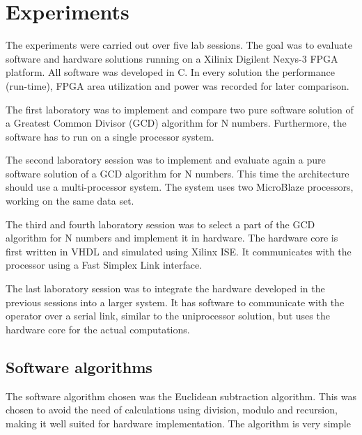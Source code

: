 \documentclass[11pt]{article}
\begin{document}
\section{Experiments\label{sec:exp}}
The experiments were carried out over five lab sessions. The goal was to evaluate software and hardware solutions running on a Xilinix Digilent Nexys-3 FPGA platform. All software was developed in C. In every solution the performance (run-time), FPGA area utilization and power was recorded for later comparison.

The first laboratory was to implement and compare two pure software solution of a Greatest Common Divisor (GCD) algorithm for N numbers. Furthermore, the software has to run on a single processor system.

The second laboratory session was to implement and evaluate again a pure software solution of a GCD algorithm for N numbers. This time the architecture should use a multi-processor system. The system uses two MicroBlaze processors, working on the same data set.

The third and fourth laboratory session was to select a part of the GCD algorithm for N numbers and implement it in hardware. The hardware core is first written in VHDL and simulated using Xilinx ISE. It communicates with the processor using a Fast Simplex Link interface\cite{fsl}.

The last laboratory session was to integrate the hardware developed in the previous sessions into a larger system. It has software to communicate with the operator over a serial link, similar to the uniprocessor solution, but uses the hardware core for the actual computations.

\subsection{Software algorithms}
The software algorithm chosen was the Euclidean subtraction algorithm. This was chosen to avoid the need of calculations using division, modulo and recursion, making it well suited for hardware implementation. The algorithm is very simple %
\end{document}
